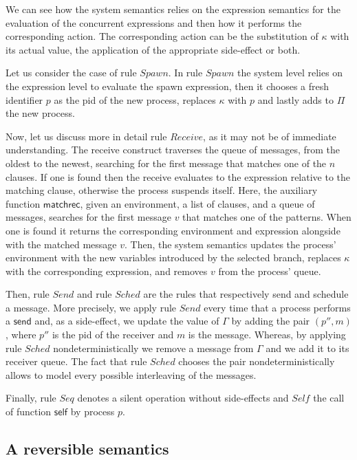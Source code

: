 \documentclass[runningheads]{llncs}
\newcommand{\ms}[1]{\mathsf{#1}}
\begin{document}

We can see how the system semantics relies on
the expression semantics for the evaluation of the concurrent expressions and
then how it performs the corresponding action. The corresponding action
can be the substitution of $\kappa$ with its actual value, the application of
the appropriate
side-effect or both.

Let us consider the case of rule $Spawn$. In
rule $Spawn$ the system level relies on the expression level to evaluate the
spawn expression, then it chooses a fresh identifier $p$ as the pid of the new process, replaces
$\kappa$ with $p$ and lastly adds to $\Pi$ the new process.

Now, let us discuss more in detail rule $Receive$, as it may not be of immediate
understanding. The receive construct traverses the queue of messages, from the
oldest to the newest, searching for the first message that matches one of the
$n$ clauses. If one is found then the receive evaluates to the expression
relative to the matching clause, otherwise the process suspends itself.
Here, the auxiliary function $\ms{matchrec}$, given an environment, a list of
clauses, and a queue of messages, searches for the first message $v$ that
matches one of the patterns. When one is found it returns the
corresponding environment and expression alongside with the matched message $v$.
Then, the system semantics updates the process' environment with the new
variables introduced by the selected branch, replaces $\kappa$ with the
corresponding expression, and removes $v$ from the process' queue.

Then, rule $Send$ and rule $Sched$ are the rules that respectively send and schedule a
message. More precisely, we apply rule $Send$ every time that a process performs a $\ms{send}$ and, as a
side-effect, we update the value of $\Gamma$ by adding the pair $(p'', m)$, where
$p''$ is the pid of the receiver and $m$ is the message. Whereas, by applying rule
$Sched$ nondeterministically we remove a message from $\Gamma$ and we add it to
its receiver queue. The fact that rule $Sched$ chooses the pair
nondeterministically allows to model every possible interleaving of the
messages.

Finally, rule $Seq$ denotes a silent operation without side-effects and $Self$
the call of function $\ms{self}$ by process $p$.

\subsection{A reversible semantics}\label{app:rev-sem} 
\end{document}
